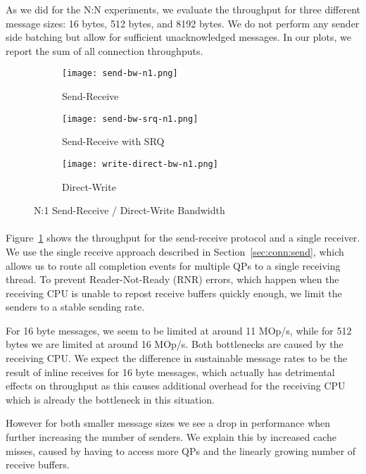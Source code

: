 As we did for the N:N experiments, we evaluate the throughput for three different message sizes: 16 bytes, 
512 bytes, and 8192 bytes. We do not perform any sender side batching but allow for sufficient unacknowledged messages.
In our plots, we report the sum of all connection throughputs.


\begin{figure}[ht]
  \centering
\begin{subfigure}[b]{0.49\textwidth}
  \centering
  \texttt{[image: send-bw-n1.png]}
  \caption{Send-Receive}
  \label{fig:plot-sndrcv-bw-n1-nosrq}
\end{subfigure}
\begin{subfigure}[b]{0.49\textwidth}
  \centering
  \texttt{[image: send-bw-srq-n1.png]}
  \caption{Send-Receive with SRQ}
  \label{fig:plot-sndrcv-bw-n1-srq}
\end{subfigure}
  \begin{subfigure}[b]{0.48\textwidth}
  \centering
  \texttt{[image: write-direct-bw-n1.png]}
  \caption{Direct-Write}
  \label{fig:plot-wdir-bw-n1}
  \end{subfigure}
\caption{N:1 Send-Receive / Direct-Write Bandwidth}
  \label{fig:plot-sndrcv-bw-n1}
\end{figure}



\paragraph{} Figure~\ref{fig:plot-sndrcv-bw-n1-nosrq} shows the throughput for the send-receive protocol and a single receiver. We
use the single receive approach described in Section~\ref{sec:conn:send}, which allows us to route all completion events for 
multiple QPs to a single receiving thread. To prevent Reader-Not-Ready (RNR) errors, which happen when the receiving CPU is 
unable to repost receive buffers quickly enough, we limit the senders to a stable sending rate.

For 16 byte messages, we seem to be limited at around 11 MOp/s, while for 512 bytes we are limited at around 16 MOp/s. Both bottlenecks
are caused by the receiving CPU. We expect the difference in sustainable message rates to be the result of inline receives for 
16 byte messages, which actually has detrimental effects on throughput as this causes additional overhead for the receiving 
CPU which 
is already the bottleneck in this situation.

However for both smaller message sizes we see a drop in performance when further increasing the number of senders. 
We explain 
this by increased cache misses, caused by having to access more QPs and the linearly growing number of receive buffers.

